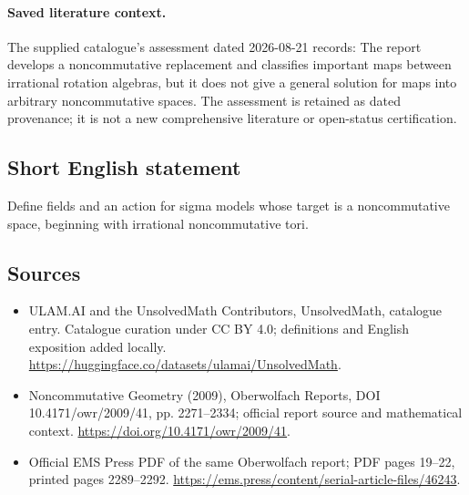 \documentclass[11pt]{article}
\begin{document}
\paragraph{Saved literature context.} The supplied catalogue's assessment dated 2026-08-21 records: The report develops a noncommutative replacement and classifies important maps between irrational rotation algebras, but it does not give a general solution for maps into arbitrary noncommutative spaces. The assessment is retained as dated provenance; it is not a new comprehensive literature or open-status certification.
\subsection{Short English statement}
Define fields and an action for sigma models whose target is a noncommutative space, beginning with irrational noncommutative tori.
\subsection{Sources}
\begin{itemize}
\item[\hypertarget{source:statement:1}{S1}] ULAM.AI and the UnsolvedMath Contributors, UnsolvedMath, catalogue entry. Catalogue curation under CC BY 4.0; definitions and English exposition added locally.
\url{https://huggingface.co/datasets/ulamai/UnsolvedMath}.
\item[\hypertarget{source:statement:2}{S2}] Noncommutative Geometry (2009), Oberwolfach Reports, DOI 10.4171/owr/2009/41, pp. 2271--2334; official report source and mathematical context.
\url{https://doi.org/10.4171/owr/2009/41}.
\item[\hypertarget{source:statement:3}{S3}] Official EMS Press PDF of the same Oberwolfach report; PDF pages 19--22, printed pages 2289--2292.
\url{https://ems.press/content/serial-article-files/46243}.
\end{itemize}
\label{end:statement}
\end{document}
